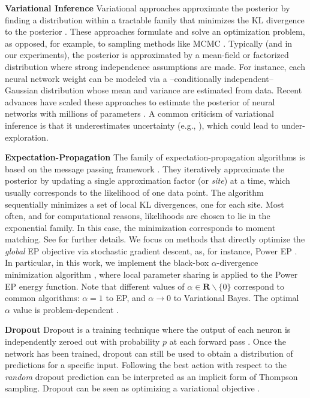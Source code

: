 \documentclass{article} \usepackage{iclr2018_conference,times}
\begin{document}
\textbf{Variational Inference}
Variational approaches approximate the posterior by finding a distribution within a tractable family that minimizes the KL divergence to the posterior \citep{hinton1993keeping}.
These approaches formulate and solve an optimization problem, as opposed, for example, to sampling methods like MCMC \citep{jordan1999introduction, wainwright2008graphical}.
Typically (and in our experiments), the posterior is approximated by a mean-field or factorized distribution where strong independence assumptions are made.
For instance, each neural network weight can be modeled via a --conditionally independent-- Gaussian distribution whose mean and variance are estimated from data.
Recent advances have scaled these approaches to estimate the posterior of neural networks with millions of parameters \citep{blundell2015weight}.
A common criticism of variational inference is that it underestimates uncertainty (e.g., \citep{bishop2006pattern}), which could lead to under-exploration.

\textbf{Expectation-Propagation} The family of expectation-propagation algorithms \citep{opper2000gaussian, minka2001family, minka2001expectation} is based on the message passing framework \citep{pearl1986fusion}. They iteratively approximate the posterior by updating a single approximation factor (or \emph{site}) at a time, which usually corresponds to the likelihood of one data point.
The algorithm sequentially minimizes a set of local KL divergences, one for each site.
Most often, and for computational reasons, likelihoods are chosen to lie in the exponential family.
In this case, the minimization corresponds to moment matching.
See \cite{gelman2014expectation} for further details.
We focus on methods that directly optimize the \emph{global} EP objective via stochastic gradient descent, as, for instance, Power EP \citep{minka2004power}.
In particular, in this work, we implement the black-box $\alpha$-divergence minimization algorithm \citep{Hernandez-Lobato2016}, where local parameter sharing is applied to the Power EP energy function.
Note that different values of $\alpha \in \mathbf{R} \backslash \{ 0 \}$ correspond to common algorithms: $\alpha = 1$ to EP, and $\alpha \to 0$ to Variational Bayes.
The optimal $\alpha$ value is problem-dependent \citep{Hernandez-Lobato2016}.

\textbf{Dropout} Dropout is a training technique where the output of each neuron is independently zeroed out with probability $p$ at each forward pass \citep{srivastava2014dropout}.
Once the network has been trained, dropout can still be used to obtain a distribution of predictions for a specific input.
Following the best action with respect to the \emph{random} dropout prediction can be interpreted as an implicit form of Thompson sampling.
Dropout can be seen as optimizing a variational objective \citep{kingma2015variational, gal2016dropout, hron2017variational}.
\end{document}
